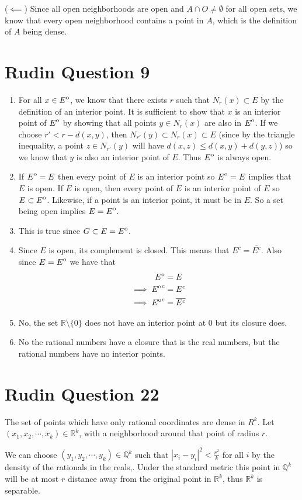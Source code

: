 \documentclass{article}
\newcommand{\interior}[1]{
  {\kern0pt#1}^{\mathrm{o}}
}
\begin{document}
\begin{enumerate}
    ($\impliedby$)
    Since all open neighborhoods are open and $A \cap O \neq \emptyset$ for all open sets,
    we know that every open neighborhood contains a point in $A$, which
    is the definition of $A$ being dense.
\newpage
\section*{Rudin Question 9}
\begin{enumerate}
    \item For all $x \in \interior{E}$, we know that there exists $r$
    such that  $N_r(x) \subset E$ by the definition of an interior point. 
    It is sufficient to show that $x$ is an interior point of $\interior{E}$
    by showing that all points $y \in N_r(x)$ are also in $\interior{E}$.
    If we choose $r' < r-d(x,y)$, then $N_{r'}(y)\subset N_r(x) \subset E$ 
    (since by the triangle inequality, a point $z \in N_{r'}(y)$
    will have $d(x,z) \leq d(x,y) + d(y,z)$)
    so we know that $y$ is also an interior point of $E$.
    Thus $\interior{E}$ is always open.
    \item If $\interior{E} = E$ then every point of $E$ is an interior point 
    so $\interior{E} = E$ implies that $E$ is open.
    If $E$ is open, then every point of $E$ is an interior point of $E$
    so $E \subset \interior{E}$.
    Likewise, if a point is an interior point, it must be in $E$.
    So a set being open implies $E = \interior{E}$.
    \item This is true since $G \subset E = \interior{E}$.
    \item Since $E$ is open, its complement is closed.
    This means that $E^c = \overline{E^c}$.
    Also since $E = \interior{E}$ we have that 
    \begin{align*}
        \interior{E} &= E\\
        \implies {\interior{E}}^c &= E^c \\
        \implies {\interior{E}}^c &= \overline{E^c} \\
    \end{align*}
    \item No, the set $\mathbb{R} \setminus \{0\}$ does not have an interior point 
    at 0 but its closure does.
    \item No the rational numbers have a closure that is the real numbers,
    but the rational numbers have no interior points.
\end{enumerate}
\newpage
\section*{Rudin Question 22}
The set of points which have only rational coordinates are dense in $R^k$.
Let $(x_1, x_2, \cdots, x_k) \in \mathbb{R}^k$, with a neighborhood around that point 
of radius $r$.

We can choose $(y_1, y_2, \cdots, y_k) \in \mathbb{Q}^k$
such that $|x_i - y_i|^2 < \frac{r^2}{k}$ for all $i$
by the density of the rationals in the reals,.
Under the standard metric this point in $\mathbb{Q}^k$ will
be at most $r$ distance away from the original point in $\mathbb{R}^k$,
thus $\mathbb{R}^k$ is separable.
\newpage
\end{enumerate}
\end{document}
